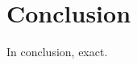 \documentclass[preprint,12pt]{elsarticle}
\begin{document}
\newpage
\section{Conclusion}
In conclusion, exact.














\end{document}
